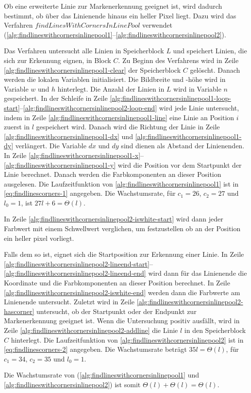 Ob eine erweiterte Linie zur Markenerkennung geeignet ist, wird dadurch bestimmt, ob über das Linienende hinaus ein
 heller Pixel liegt. Dazu wird das Verfahren $\mathit{findLinesWithCornersInLinePool}$ verwendet
 (\autoref{alg:findlineswithcornersinlinepool1}--\autoref{alg:findlineswithcornersinlinepool2}).

Das Verfahren untersucht alle Linien in Speicherblock $L$ und speichert Linien, die sich zur Erkennung eignen, in Block
 $C$. Zu Beginn des Verfahrens wird in Zeile \ref{alg:findlineswithcornersinlinepool1-clear} der Speicherblock $C$
 gelöscht. Danach werden die lokalen Variablen initialisiert. Die Bildbreite und -höhe wird in Variable $w$ und $h$
 hinterlegt. Die Anzahl der Linien in $L$ wird in Variable $n$ gespeichert. In der Schleife in Zeile
 \ref{alg:findlineswithcornersinlinepool1-loop-start}--\ref{alg:findlineswithcornersinlinepool2-loop-end} wird jede
 Linie untersucht, indem in Zeile \ref{alg:findlineswithcornersinlinepool1-line} eine Linie an Position $i$ zuerst in
 $l$ gespeichert wird. Danach wird die Richtung der Linie in Zeile \ref{alg:findlineswithcornersinlinepool1-dx} und
 \ref{alg:findlineswithcornersinlinepool1-dy} verlängert. Die Variable $dx$ und $dy$ sind dienen als Abstand der
 Linienenden. In Zeile \ref{alg:findlineswithcornersinlinepool1-x}--\ref{alg:findlineswithcornersinlinepool1-y} wird
 die Position vor dem Startpunkt der Linie berechnet. Danach werden die Farbkomponenten an dieser Position ausgelesen.
 Die Laufzeitfunktion von \autoref{alg:findlineswithcornersinlinepool1} ist in \autoref{eq:findlinescorners-1}
 angegeben. Die Wachstumsrate, für $c_{1} = 26$, $c_{2} = 27$ und $l_{0} = 1$, ist $27l + 6 = \Theta(l)$.

In Zeile \ref{alg:findlineswithcornersinlinepool2-iswhite-start} wird dann jeder Farbwert mit einem Schwellwert
 verglichen, um festzustellen ob an der Position ein heller \gls{pixel} vorliegt.

Falls dem so ist, eignet sich die Startposition zur Erkennung einer Linie. In Zeile
 \ref{alg:findlineswithcornersinlinepool2-lineend-start}--\ref{alg:findlineswithcornersinlinepool2-lineend-end} wird
 dann für das Linienende die Koordinate und die Farbkomponenten an dieser Position berechnet. In Zeile
 \ref{alg:findlineswithcornersinlinepool2-iswhite-end} werden dann die Farbwerte am Linienende untersucht. Zuletzt wird
 in Zeile \ref{alg:findlineswithcornersinlinepool2-hascorner} untersucht, ob der Startpunkt oder der Endpunkt zur
 Markenerkennung geeignet ist. Wenn die Untersuchung positiv ausfällt, wird in Zeile
 \ref{alg:findlineswithcornersinlinepool2-addline} die Linie $l$ in den Speicherblock $C$ hinterlegt. Die
 Laufzeitfunktion von \autoref{alg:findlineswithcornersinlinepool2} ist in \autoref{eq:findlinescorners-2} angegeben.
 Die Wachstumsrate beträgt $35l = \Theta(l)$, für $c_{1}=34$, $c_{2}=35$ und $l_{0}=1$.

Die Wachstumsrate von 
 (\autoref{alg:findlineswithcornersinlinepool1} und \autoref{alg:findlineswithcornersinlinepool2}) ist somit
 $\Theta(l) + \Theta(l) = \Theta(l)$.


